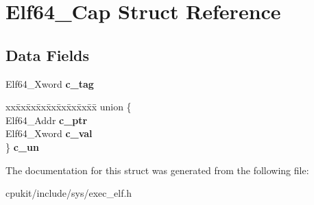 \hypertarget{structElf64__Cap}{}\section{Elf64\+\_\+\+Cap Struct Reference}
\label{structElf64__Cap}
\subsection*{Data Fields}
\begin{DoxyCompactItemize}
\item 
\mbox{\label{structElf64__Cap_a35ca851346657a5b632e670469b37bd7}} 
Elf64\+\_\+\+Xword {\bfseries c\+\_\+tag}
\item 
\mbox{\label{structElf64__Cap_a64ffcfa1fb255c8f53bf8749dde2b10e}} 
\begin{tabbing}
xx\=xx\=xx\=xx\=xx\=xx\=xx\=xx\=xx\=\kill
union \{\\
\>Elf64\_Addr {\bfseries c\_ptr}\\
\>Elf64\_Xword {\bfseries c\_val}\\
\} {\bfseries c\_un}\\

\end{tabbing}\end{DoxyCompactItemize}


The documentation for this struct was generated from the following file\+:\begin{DoxyCompactItemize}
\item 
cpukit/include/sys/exec\+\_\+elf.\+h\end{DoxyCompactItemize}

